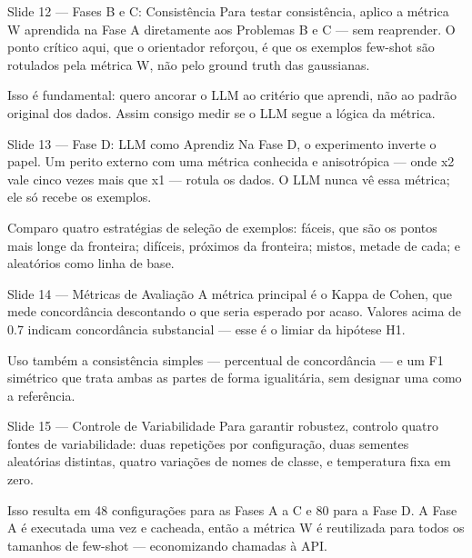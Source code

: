\documentclass[aspectratio=169, 14pt]{beamer}
\begin{document}
\begin{frame}{Slide 12 — Fases B e C: Consistência}
  Para testar consistência, aplico a métrica W aprendida na Fase A diretamente aos Problemas B e C — sem reaprender. O ponto crítico aqui, que o orientador reforçou, é que os exemplos few-shot são rotulados pela métrica W, não pelo ground truth das gaussianas.

  Isso é fundamental: quero ancorar o LLM ao critério que aprendi, não ao padrão original dos dados. Assim consigo medir se o LLM segue a lógica da métrica.
\end{frame}

\begin{frame}{Slide 13 — Fase D: LLM como Aprendiz}
  Na Fase D, o experimento inverte o papel. Um perito externo com uma métrica conhecida e anisotrópica — onde x2 vale cinco vezes mais que x1 — rotula os dados. O LLM nunca vê essa métrica; ele só recebe os exemplos.

  Comparo quatro estratégias de seleção de exemplos: fáceis, que são os pontos mais longe da fronteira; difíceis, próximos da fronteira; mistos, metade de cada; e aleatórios como linha de base.
\end{frame}

\begin{frame}{Slide 14 — Métricas de Avaliação}
  A métrica principal é o Kappa de Cohen, que mede concordância descontando o que seria esperado por acaso. Valores acima de 0.7 indicam concordância substancial — esse é o limiar da hipótese H1.

  Uso também a consistência simples — percentual de concordância — e um F1 simétrico que trata ambas as partes de forma igualitária, sem designar uma como a referência.
\end{frame}

\begin{frame}{Slide 15 — Controle de Variabilidade}
  Para garantir robustez, controlo quatro fontes de variabilidade: duas repetições por configuração, duas sementes aleatórias distintas, quatro variações de nomes de classe, e temperatura fixa em zero.

  Isso resulta em 48 configurações para as Fases A a C e 80 para a Fase D. A Fase A é executada uma vez e cacheada, então a métrica W é reutilizada para todos os tamanhos de few-shot — economizando chamadas à API.
\end{frame}
\end{document}
